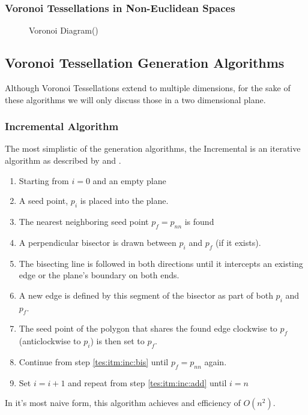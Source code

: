 \subsubsection{Voronoi Tessellations in Non-Euclidean Spaces}\label{tes:ssec:warp}

%
\begin{figure}[H]
    \centering
    \caption{Voronoi Diagram(\cite{voronoipic})}
    \label{tes:fig:voreg}
\end{figure}
\subsection{Voronoi Tessellation Generation Algorithms}\label{tes:sec:tga}
Although Voronoi Tessellations extend to multiple dimensions, for the sake of these algorithms we will only discuss those in a two dimensional plane.
%
\subsubsection{Incremental Algorithm}\label{tes:ssec:inc}
The most simplistic of the generation algorithms, the Incremental is an iterative algorithm as described by \cite{green1978computing} and \cite{okabe2009spatial}.
\begin{enumerate}
\item Starting from $i=0$ and an empty plane
\item\label{tes:itm:inc:add} A seed point, $p_i$ is placed into the plane.
\item The nearest neighboring seed point $p_f=p_{nn}$ is found
\item\label{tes:itm:inc:bis} A perpendicular bisector is drawn between $p_i$ and $p_f$ (if it exists).
\item The bisecting line is followed in both directions until it intercepts an existing edge or the plane's boundary on both ends.
\item A new edge is defined by this segment of the bisector as part of both $p_i$ and $p_f$.
\item The seed point of the polygon that shares the found edge clockwise to $p_f$ (anticlockwise to $p_i$) is then set to $p_f$.
\item Continue from step \ref{tes:itm:inc:bis} until $p_f=p_{nn}$ again.
\item Set $i = i +1$ and repeat from step \ref{tes:itm:inc:add} until $i=n$
\end{enumerate}
In it's most naive form, this algorithm achieves and efficiency of $O(n^2)$.
%
